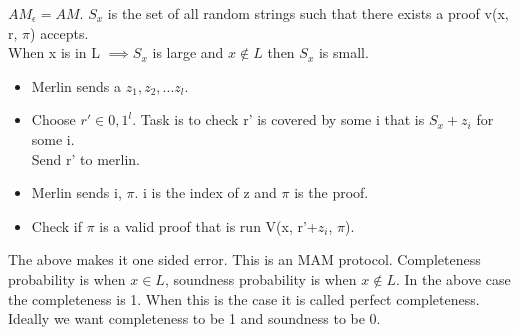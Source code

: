 \documentclass[solution,addpoints,12pt]{exam}
\begin{document}
$AM_\epsilon = AM.$
$S_x$ is the set of all random strings such that there
exists a proof v(x, r, $\pi$) accepts.\\
When x is in L $\implies S_x$ is large and
$x \not \in L$ then $S_x$ is small.\\
\begin{itemize}
\item Merlin sends a $z_1, z_2, ... z_l$.
\item Choose $r' \in {0, 1}^l$. Task is to check
r' is covered by some i that is $S_x + z_i$ for some i.\\
Send r' to merlin.\\
\item Merlin sends i, $\pi$. i is the index of z
and $\pi$ is the proof.
\item Check if $\pi$ is a valid proof that is run V(x, r'+$z_i$, $\pi$).
\end{itemize}
The above makes it one sided error. This is an MAM protocol.
Completeness probability is when $x \in L$, soundness probability
is when $x \not \in L$. In the above case the completeness
is 1. When this is the case it is called perfect completeness.
Ideally we want completeness to be 1 and soundness to be 0.\\
\end{document}
